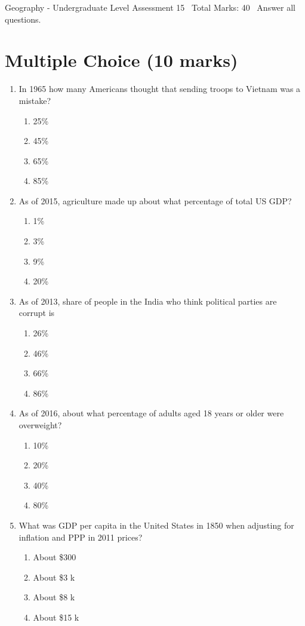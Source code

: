 \documentclass[12pt]{article}
\begin{document}
\begin{center}
Geography - Undergraduate Level Assessment 15 \
Total Marks: 40 \
Answer all questions.
\end{center}

\section*{Multiple Choice (10 marks)}
\begin{enumerate}[label=\arabic*.]
\item In 1965 how many Americans thought that sending troops to Vietnam was a mistake?
\begin{enumerate}[label=(\alph*)]
    \item 25\%
    \item 45\%
    \item 65\%
    \item 85\%
\end{enumerate}
\item As of 2015, agriculture made up about what percentage of total US GDP?
\begin{enumerate}[label=(\alph*)]
    \item 1\%
    \item 3\%
    \item 9\%
    \item 20\%
\end{enumerate}
\item As of 2013, share of people in the India who think political parties are corrupt is
\begin{enumerate}[label=(\alph*)]
    \item 26\%
    \item 46\%
    \item 66\%
    \item 86\%
\end{enumerate}
\item As of 2016, about what percentage of adults aged 18 years or older were overweight?
\begin{enumerate}[label=(\alph*)]
    \item 10\%
    \item 20\%
    \item 40\%
    \item 80\%
\end{enumerate}
\item What was GDP per capita in the United States in 1850 when adjusting for inflation and PPP in 2011 prices?
\begin{enumerate}[label=(\alph*)]
    \item About \$300
    \item About \$3 k
    \item About \$8 k
    \item About \$15 k
\end{enumerate}
\end{enumerate}
\end{document}
